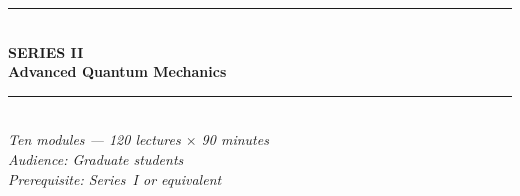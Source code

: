 \documentclass[11pt,a4paper]{article}
\begin{document}
\newpage
\thispagestyle{empty}
\pagecolor{darkblue}
\color{white}
\vspace*{2.2cm}
\begin{center}
  {\color{accentgold}\rule{11cm}{1.5pt}}\\[0.5cm]
  {\fontsize{11}{14}\selectfont\bfseries\color{accentgold}\MakeUppercase{Series II}}\\[0.3cm]
  {\fontsize{26}{32}\selectfont\bfseries Advanced Quantum Mechanics}\\[0.4cm]
  {\color{accentgold}\rule{11cm}{1.5pt}}\\[1.0cm]
  {\large\itshape Ten modules --- 120 lectures $\times$ 90 minutes}\\[0.5cm]
  {\normalsize\itshape Audience: Graduate students}\\[0.3cm]
  {\normalsize\itshape Prerequisite: Series~I or equivalent}\\[1.4cm]


\end{center}
\end{document}
